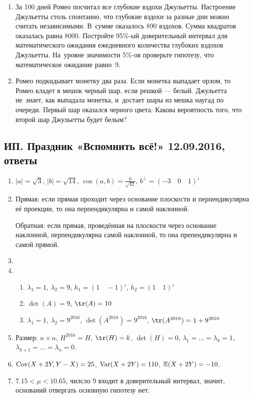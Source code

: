 \documentclass[12pt, a4paper]{article}
\theoremstyle{definition}
\begin{document}
\begin{enumerate}
\item За 100 дней Ромео посчитал все глубокие вздохи Джульетты. Настроение Джульетты столь спонтанно, что глубокие вздохи за разные дни можно считать независимыми. В~сумме оказалось 890 вздохов. Сумма квадратов оказалась равна 8000. Постройте 95\%-ый доверительный интервал для математического ожидания ежедневного количества глубоких вздохов Джульетты. На~уровне значимости 5\%-ов проверьте гипотезу, что математическое ожидание равно~9.

\item Ромео подкидывает монетку два раза. Если монетка выпадает орлом, то Ромео кладет в мешок черный шар, если решкой — белый. Джульетта не~знает, как выпадала монетка, и~достает шары из мешка наугад по очереди. Первый шар оказался черного цвета. Какова вероятность того, что второй шар Джульетты будет белым?

\end{enumerate}




\subsection{ИП. Праздник «Вспомнить всё!» 12.09.2016, ответы}

\begin{enumerate}
\item $\lvert a \rvert = \sqrt{3}$, $\lvert b \rvert = \sqrt{14}$, $\cos(a,b) = \frac{6}{\sqrt{42}}$, $b^{\perp} = (-3 \quad 0 \quad 1)'$
\item Прямая: если прямая проходит через основание плоскости и перпендикулярна её проекции, то она перпендикулярна и самой наклонной.

Обратная: если прямая, проведённая на плоскости через основание наклонной, перпендикулярна самой наклонной, то она препендикулярна и самой прямой.
\item
\item
\begin{enumerate}
\item $\lambda_1 = 1$, $\lambda_2 = 9$, $h_1 = (1 \quad -1)'$, $h_2 = (1 \quad 1)'$
\item $\det(A) = 9$, $\tr(A) = 10$
\item $\lambda_1 = 1$, $\lambda_2 = 9^{2016}$, $\det(A^{2016}) = 9^{2016}$, $\tr(A^{2016}) = 1 + 9^{2016}$
\end{enumerate}
\item Размер: $n \times n$, $H^{2016} = H$, $\tr(H) = k$, $\det(H) = 0$, $\lambda_1 = \ldots = \lambda_k = 1$, $\lambda_{k+1} = \ldots = \lambda_{n} = 0$.
\item  $\operatorname{Cov}(X+2Y, Y-X) = 25$, $\operatorname{Var}(X+2Y) = 110$, $\mathbb{E}(X+2Y) = -10$.
\item $7.15 < \mu < 10.65$, чилсло $9$ входит в доверительный интервал, значит, оснований отвергать основную гипотезу нет.
\end{enumerate}
\end{document}

